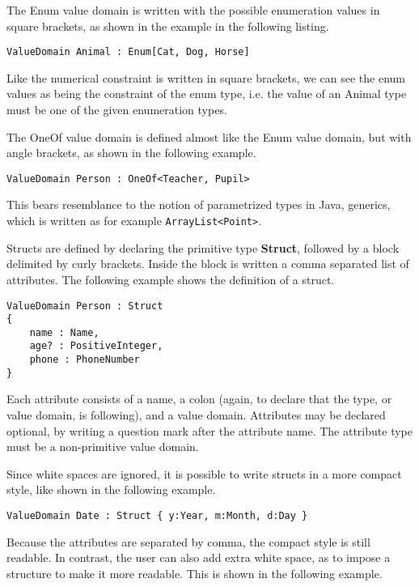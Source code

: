 The Enum value domain is written with the possible enumeration values
in square brackets, as shown in the example in the following listing.

\begin{lstlisting}[language=edma]
ValueDomain Animal : Enum[Cat, Dog, Horse]
\end{lstlisting}

Like the numerical constraint is written in square brackets, we can
see the enum values as being the constraint of the enum type, i.e.
the value of an Animal type must be one of the given enumeration types.

The OneOf value domain is defined almost like the Enum value domain,
but with angle brackets, as shown in the following example.

\begin{lstlisting}[language=edma]
ValueDomain Person : OneOf<Teacher, Pupil>
\end{lstlisting}

This bears resemblance to the notion of parametrized types in Java,
generics, which is written as for example \texttt{ArrayList<Point>}.

Structs are defined by declaring the primitive type \textbf{Struct},
followed by a block delimited by curly brackets. Inside the block
is written a comma separated list of attributes. The following example
shows the definition of a struct.

\begin{lstlisting}[language=edma]
ValueDomain Person : Struct
{
	name : Name,
	age? : PositiveInteger,
	phone : PhoneNumber
}
\end{lstlisting}

Each attribute consists of a name, a colon (again, to declare that
the type, or value domain, is following), and a value domain. Attributes
may be declared optional, by writing a question mark after the attribute
name. The attribute type must be a non-primitive value domain. 

Since white spaces are ignored, it is possible to write structs in
a more compact style, like shown in the following example.

\begin{lstlisting}[language=edma]
ValueDomain Date : Struct { y:Year, m:Month, d:Day }
\end{lstlisting}

Because the attributes are separated by comma, the compact style is
still readable. In contrast, the user can also add extra white space,
as to impose a structure to make it more readable. This is shown in
the following example.

